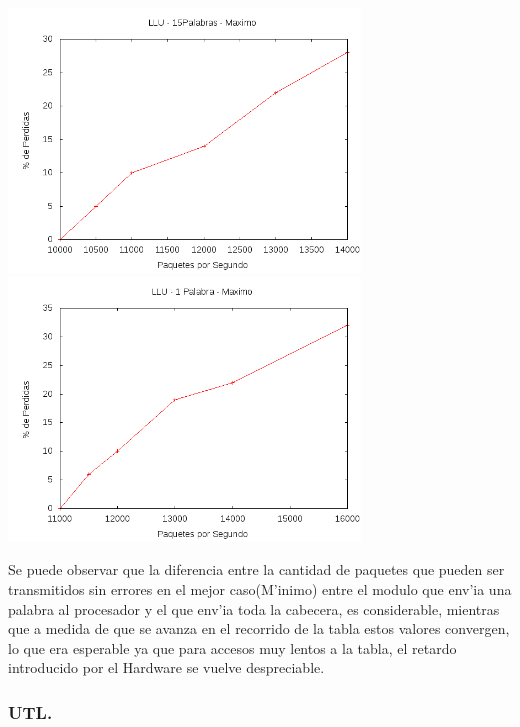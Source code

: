 \documentclass[12pt,spanish]{article}
\begin{document}
\begin{center}
\includegraphics[width=0.7\textwidth]{graf/llu15pmax.png}
\includegraphics[width=0.7\textwidth]{graf/llu1pmax.png}	
\end{center}


Se puede observar que la diferencia entre la cantidad de paquetes que pueden ser transmitidos sin errores en el mejor caso(M'inimo) entre el modulo que env'ia una palabra al procesador y el que env'ia toda la cabecera, es considerable, mientras que a medida de que se avanza en el recorrido de la tabla estos valores convergen, lo que era esperable ya que para accesos muy lentos a la tabla, el retardo introducido por el Hardware se vuelve despreciable.


\subsubsection*{UTL.}
\end{document}
